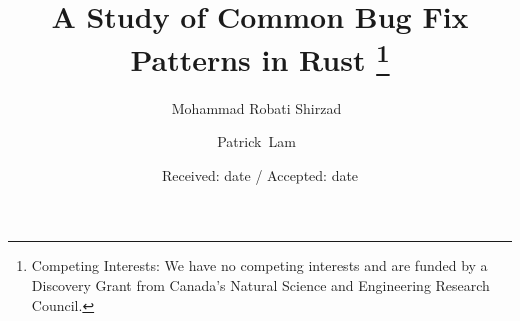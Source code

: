 \documentclass[smallextended]{svjour3}       %
\begin{document}
\title{A Study of Common Bug Fix Patterns in Rust
\thanks{Competing Interests: We have no competing interests and are funded by a Discovery Grant from Canada's Natural Science and Engineering Research Council.}
}
\subtitle{}
\newcommand{\orcid}[1]{$\,$\href{https://orcid.org/#1}{\textcolor{orcidlogocol}{\faOrcid}}}

\author{Mohammad Robati Shirzad \orcid{0000-0002-6297-8229}       \and
        Patrick~Lam \orcid{0000-0001-8278-5400} %
}



\date{Received: date / Accepted: date}


\maketitle
\end{document}
